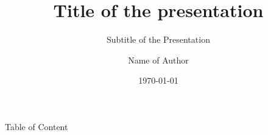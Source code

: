 \documentclass{libs/ufc_format}
\title[short title of the pre]{\huge\textbf{Title of the presentation}}
\subtitle{Subtitle of the Presentation}
\author{Name of Author}
\institute[UFC]{
    \normalsize{\email{name@mail.sustech.edu.cn}}
    \newline
    \department{Name of the Department}
    \newline
    \SUSTech
}
\date{\today}
\begin{document}


\begin{frame}{}
    \maketitle
\end{frame}

\begin{frame}{Table of Content}
    \begin{multicols}{2}
        \tableofcontents
    \end{multicols}
\end{frame}


    


\end{document}
